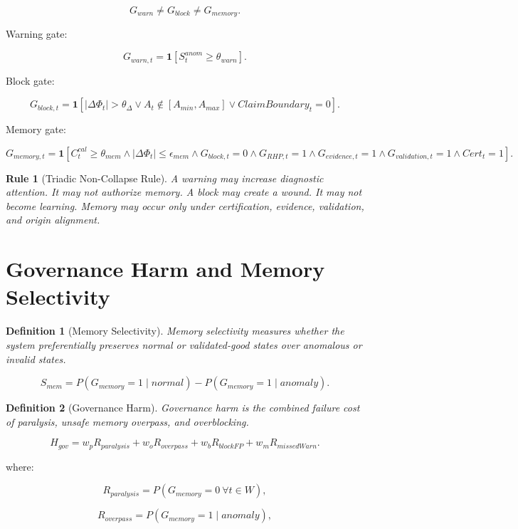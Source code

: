 \documentclass[12pt]{article}
\newtheorem{definition}{Definition}
\newtheorem{rulebox}{Rule}
\begin{document}
\[
G_{warn}\neq G_{block}\neq G_{memory}.
\]

Warning gate:

\[
G_{warn,t}=\mathbf{1}[S^{anom}_t\geq\theta_{warn}].
\]

Block gate:

\[
G_{block,t}=\mathbf{1}\left[
|\Delta\Phi_t|>\theta_{\Delta}
\vee
A_t\notin[A_{min},A_{max}]
\vee
ClaimBoundary_t=0
\right].
\]

Memory gate:

\[
\boxed{
G_{memory,t}=\mathbf{1}\left[
C^{cal}_t\geq\theta_{mem}
\wedge
|\Delta\Phi_t|\leq\epsilon_{mem}
\wedge
G_{block,t}=0
\wedge
G_{RHP,t}=1
\wedge
G_{evidence,t}=1
\wedge
G_{validation,t}=1
\wedge
Cert_t=1
\right].
}
\]

\begin{rulebox}[Triadic Non-Collapse Rule]
A warning may increase diagnostic attention. It may not authorize memory. A
block may create a wound. It may not become learning. Memory may occur only
under certification, evidence, validation, and origin alignment.
\end{rulebox}

\section{Governance Harm and Memory Selectivity}

\begin{definition}[Memory Selectivity]
Memory selectivity measures whether the system preferentially preserves normal
or validated-good states over anomalous or invalid states.
\end{definition}

\[
\boxed{
S_{mem}
=
P(G_{memory}=1\mid normal)
-
P(G_{memory}=1\mid anomaly).
}
\]

\begin{definition}[Governance Harm]
Governance harm is the combined failure cost of paralysis, unsafe memory
overpass, and overblocking.
\end{definition}

\[
\boxed{
H_{gov}
=
w_p R_{paralysis}
+
w_o R_{overpass}
+
w_b R_{blockFP}
+
w_m R_{missedWarn}.
}
\]

where:

\[
R_{paralysis}=P(G_{memory}=0\ \forall t\in W),
\]

\[
R_{overpass}=P(G_{memory}=1\mid anomaly),
\]
\end{document}
